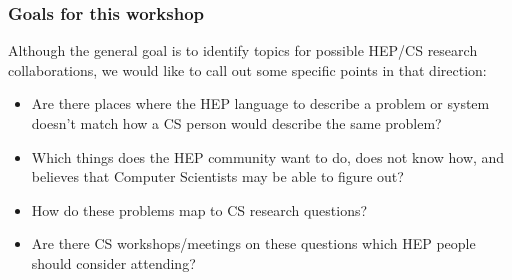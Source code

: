 \begin{frame}
\frametitle{Goals for this workshop}
Although the general goal is to identify topics for possible HEP/CS research collaborations, we would like to call out some specific points in that direction:
\begin{itemize}
\item Are there places where the HEP language to describe a problem or system doesn't match how a CS person would describe the same problem?
\item Which things does the HEP community want to do, does not know how, and believes that Computer Scientists may be able to figure out?
\item How do these problems map to CS research questions?
\item Are there CS workshops/meetings on these questions which HEP people should consider attending?
\end{itemize}

\end{frame}


